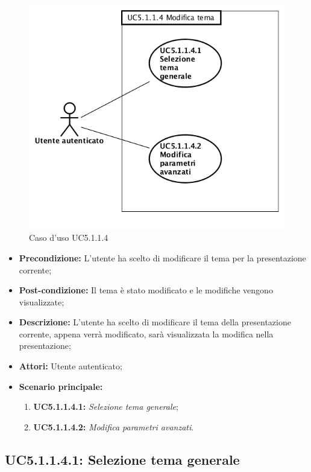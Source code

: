 \begin{figure}[h]
	\begin{center}
	\includegraphics[scale=0.4]{diagram/UC5-1-1-4.png}
	\caption{Caso d'uso UC5.1.1.4}
	\end{center}
\end{figure}
\begin{itemize}
	\item \textbf{Precondizione:} L’utente ha scelto di modificare il tema per la presentazione corrente;
	\item \textbf{Post-condizione:} Il tema è stato modificato e le modifiche vengono visualizzate;
	\item \textbf{Descrizione:} L'utente ha scelto di modificare il tema della presentazione corrente, appena verrà modificato, sarà visualizzata la modifica nella presentazione;
	\item \textbf{Attori:} Utente autenticato;
	\item \textbf{Scenario principale:}
	\begin{enumerate}
		\item \textbf{ UC5.1.1.4.1:} \textit{ Selezione tema generale};
		\item \textbf{ UC5.1.1.4.2:} \textit{ Modifica parametri avanzati}.
	\end{enumerate}
\end{itemize}
\subsection{ UC5.1.1.4.1: Selezione tema generale}

